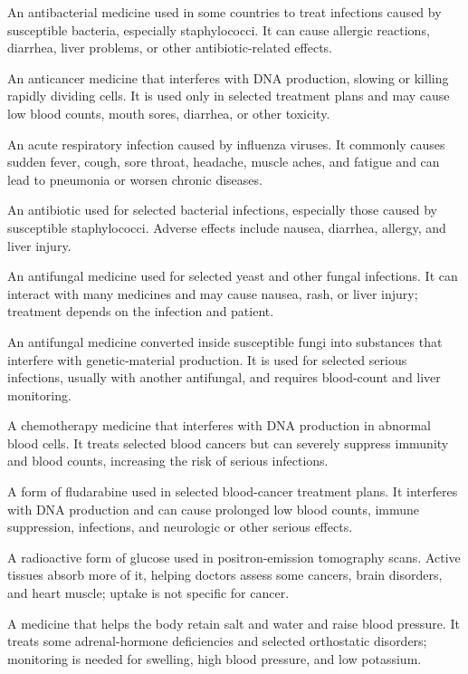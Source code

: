  An antibacterial medicine used in some countries to treat infections caused by susceptible bacteria, especially staphylococci. It can cause allergic reactions, diarrhea, liver problems, or other antibiotic-related effects.

 An anticancer medicine that interferes with DNA production, slowing or killing rapidly dividing cells. It is used only in selected treatment plans and may cause low blood counts, mouth sores, diarrhea, or other toxicity.

 An acute respiratory infection caused by influenza viruses. It commonly causes sudden fever, cough, sore throat, headache, muscle aches, and fatigue and can lead to pneumonia or worsen chronic diseases.

 An antibiotic used for selected bacterial infections, especially those caused by susceptible staphylococci. Adverse effects include nausea, diarrhea, allergy, and liver injury.

 An antifungal medicine used for selected yeast and other fungal infections. It can interact with many medicines and may cause nausea, rash, or liver injury; treatment depends on the infection and patient.

 An antifungal medicine converted inside susceptible fungi into substances that interfere with genetic-material production. It is used for selected serious infections, usually with another antifungal, and requires blood-count and liver monitoring.

 A chemotherapy medicine that interferes with DNA production in abnormal blood cells. It treats selected blood cancers but can severely suppress immunity and blood counts, increasing the risk of serious infections.

 A form of fludarabine used in selected blood-cancer treatment plans. It interferes with DNA production and can cause prolonged low blood counts, immune suppression, infections, and neurologic or other serious effects.

 A radioactive form of glucose used in positron-emission tomography scans. Active tissues absorb more of it, helping doctors assess some cancers, brain disorders, and heart muscle; uptake is not specific for cancer.

 A medicine that helps the body retain salt and water and raise blood pressure. It treats some adrenal-hormone deficiencies and selected orthostatic disorders; monitoring is needed for swelling, high blood pressure, and low potassium.

